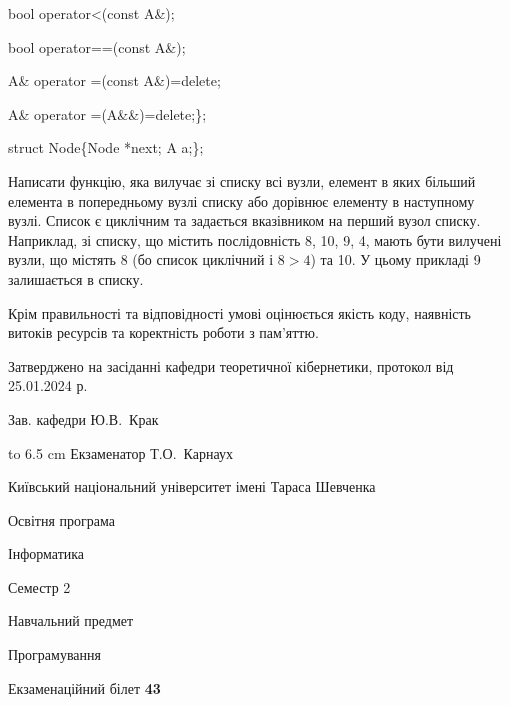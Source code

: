 \documentclass[12pt, ukrainian]{article}
\begin{document}
{\quad  bool operator<(const A\&); 

\quad  bool operator==(const A\&); 

\quad A\& operator =(const A\&)=delete; 

\quad  A\& operator =(A\&\&)=delete;\};

struct Node\{Node *next; A a;\};

 Написати функцію, яка вилучає зі списку всі вузли, елемент в яких більший елемента в попередньому вузлі списку або дорівнює елементу в наступному вузлі. Список є циклічним та задається вказівником на перший вузол списку. Наприклад, зі списку, що містить послідовність 8, 10, 9, 4, мають бути вилучені вузли, що містять 8 (бо список циклічний і $8>4$) та 10. У цьому прикладі 9 залишається в списку.

Крім правильності та відповідності умові оцінюється якість коду, наявність витоків ресурсів та коректність роботи з пам'яттю. 

}
{\smallskip\smallskip \begin {scriptsize} Затверджено на засіданні кафедри теоретичної кібернетики, протокол   від   25.01.2024 р.\par\smallskip\smallskip\smallskip\smallskip
{\parbox {6.5 cm} {Зав. кафедри \dotfill Ю.В.~Крак}}\hspace {0.7cm} {\hbox to 6.5 cm { Екзаменатор \dotfill Т.О.~Карнаух}} \end{scriptsize}}
\newpage
{{\begin {scriptsize}\par
{ \center  Київський національний університет імені Тараса Шевченка \par}
{\parbox {5 cm}{Освітня програма \hfill}{\parbox {7 cm}{Інформатика\hfill}}\parbox {6 cm}{\hfill Семестр 2}}\par
{\parbox {5 cm} {Навчальний предмет \hfill}\parbox {7 cm}{Програмування \hfill}\parbox {6cm}{\hfill}\par}\vspace{-15pt} \end{scriptsize}}{\center Екзаменаційний білет \No \textbf { 43 }\par}}
\end{document}
